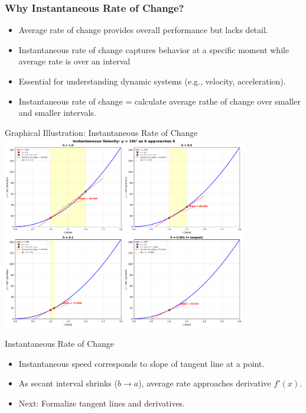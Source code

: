 \documentclass{beamer}
\begin{document}
\begin{frame}
\frametitle{Why Instantaneous Rate of Change?}
\begin{itemize}
  \item Average rate of change provides overall performance but lacks detail.
  \item Instantaneous rate of change captures behavior at a specific moment while average rate is over an interval
  \item Essential for understanding dynamic systems (e.g., velocity, acceleration).
  \item Instantaneous rate of change = calculate average rathe of change over smaller and smaller intervals.
\end{itemize}
\end{frame}
\begin{frame}{Graphical Illustration: Instantaneous Rate of Change}
  \centering
  \includegraphics[width=0.8\textwidth]{figures/instantaneous_rate_change.png}
\end{frame}

\begin{frame}{Instantaneous Rate of Change}
  \begin{itemize}
    \item Instantaneous speed corresponds to slope of tangent line at a point.
    \item As secant interval shrinks ($b\to a$), average rate approaches derivative $f'(x)$.
    \item Next: Formalize tangent lines and derivatives.
  \end{itemize}
\end{frame}
\end{document}
